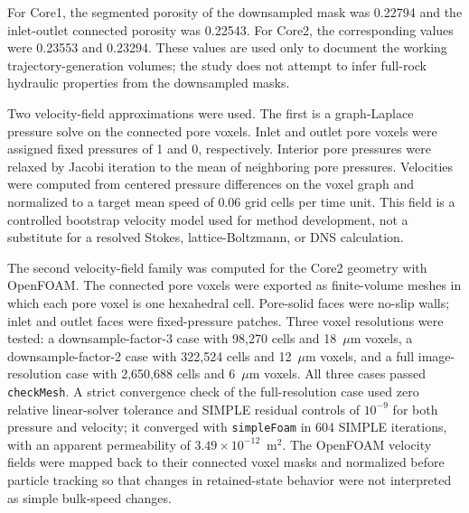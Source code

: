 \documentclass[11pt]{article}
\begin{document}
For Core1, the segmented porosity of the downsampled mask was 0.22794 and the inlet-outlet connected porosity was 0.22543. For Core2, the corresponding values were 0.23553 and 0.23294. These values are used only to document the working trajectory-generation volumes; the study does not attempt to infer full-rock hydraulic properties from the downsampled masks.

Two velocity-field approximations were used. The first is a graph-Laplace pressure solve on the connected pore voxels. Inlet and outlet pore voxels were assigned fixed pressures of 1 and 0, respectively. Interior pore pressures were relaxed by Jacobi iteration to the mean of neighboring pore pressures. Velocities were computed from centered pressure differences on the voxel graph and normalized to a target mean speed of 0.06 grid cells per time unit. This field is a controlled bootstrap velocity model used for method development, not a substitute for a resolved Stokes, lattice-Boltzmann, or DNS calculation.

The second velocity-field family was computed for the Core2 geometry with OpenFOAM. The connected pore voxels were exported as finite-volume meshes in which each pore voxel is one hexahedral cell. Pore-solid faces were no-slip walls; inlet and outlet faces were fixed-pressure patches. Three voxel resolutions were tested: a downsample-factor-3 case with 98,270 cells and 18~$\mu$m voxels, a downsample-factor-2 case with 322,524 cells and 12~$\mu$m voxels, and a full image-resolution case with 2,650,688 cells and 6~$\mu$m voxels. All three cases passed \texttt{checkMesh}. A strict convergence check of the full-resolution case used zero relative linear-solver tolerance and SIMPLE residual controls of $10^{-9}$ for both pressure and velocity; it converged with \texttt{simpleFoam} in 604 SIMPLE iterations, with an apparent permeability of $3.49\times 10^{-12}$~m$^2$. The OpenFOAM velocity fields were mapped back to their connected voxel masks and normalized before particle tracking so that changes in retained-state behavior were not interpreted as simple bulk-speed changes.
\end{document}

